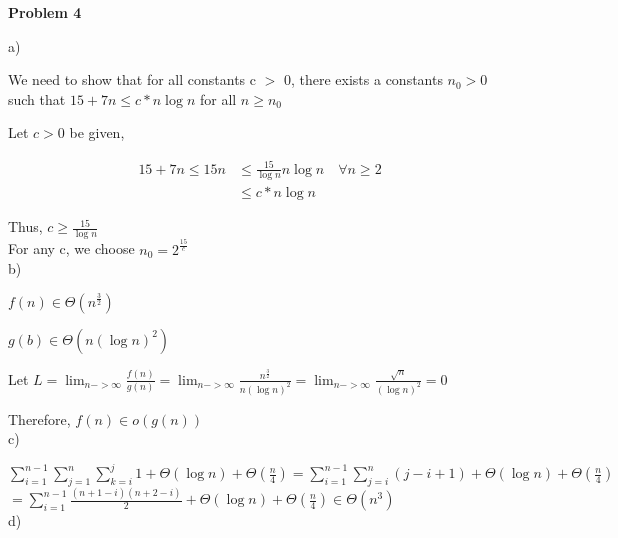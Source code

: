 \documentclass[12pt]{article}
\begin{document}
	
	\begin{center}
		{\Large\bf Problem 4}\\
		\vspace{3mm}
	\end{center}
	
	\def\question#1{\item[\bf #1.]}
	\def\part#1{\item[\bf #1)]}
	\newcommand{\pc}[1]{\mbox{\textbf{#1}}} %
	
	
	
	a)
	
	We need to show that for all constants c $>$ 0, there exists a constants $n_0 > 0$ such that $15+7n \leq c*n\log n$ for all $n \geq n_0$
	
	
	Let $c>0$ be given,
	\begin{center}
		\begin{align*}
			15+7n \leq 15n &\leq \frac{15}{\log n} n \log n \quad \forall n \geq 2\\
			&\leq c*n\log n
		\end{align*}
	\end{center}
	Thus, $c \geq \frac{15}{\log n}$\\
	For any c, we choose $n_0 = 2^{\frac{15}{c}}$\\
	
	
	b)
	
	$f(n) \in \Theta(n^{\frac{3}{2}})$
	
	$g(b) \in \Theta(n(\log n)^2)$
	
	Let $L =\lim_{n->\infty} \frac{f(n)}{g(n)} =\lim_{n->\infty} \frac{n^\frac{3}{2}}{n(\log n)^2} =\lim_{n->\infty} \frac{\sqrt{n}}{(\log n)^2} = 0$
	
	Therefore, $f(n) \in o(g(n))$\\
	
	
	c)
	
	$\sum_{i = 1}^{n-1} \sum_{j=1}^{n} \sum_{k=i}^{j} 1 + \Theta(\log n) + \Theta(\frac{n}{4}) = \sum_{i = 1}^{n-1} \sum_{j=i}^{n} (j-i+1) + \Theta(\log n) + \Theta(\frac{n}{4})$\\
	$=\sum_{i = 1}^{n-1} \frac{(n+1-i)(n+2-i)}{2} + \Theta(\log n) + \Theta(\frac{n}{4}) \in \Theta(n^3) $\\
	
	
	d)
	
\end{document}
